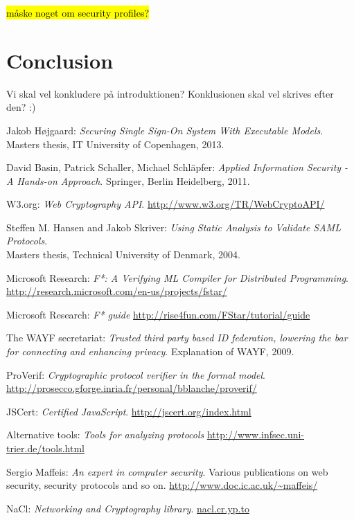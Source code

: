 \documentclass[twosided]{report}
\begin{document}
\hl{m{\aa}ske noget om security profiles?}
\section{Conclusion}
Vi skal vel konkludere på introduktionen? Konklusionen skal vel skrives efter den? :)
\begin{thebibliography}{9}

  Jakob H{\o}jgaard:
  \emph{Securing Single Sign-On System With Executable Models}.
  Masters thesis, IT University of Copenhagen,
  2013.

  David Basin, Patrick Schaller, Michael Schl{\"a}pfer:
  \emph{Applied Information Security - A Hands-on Approach}.
  Springer, Berlin Heidelberg,
  2011.

	W3.org: \emph{Web Cryptography API}. \url{http://www.w3.org/TR/WebCryptoAPI/}

  Steffen M. Hansen and Jakob Skriver:
  \emph{Using Static Analysis to Validate SAML Protocols}.
  \\Masters thesis, Technical University of Denmark,
  2004.

 Microsoft Research:
 \emph{F*: A Verifying ML Compiler for Distributed Programming}.
 \url{http://research.microsoft.com/en-us/projects/fstar/}

 Microsoft Research:
 \emph{F* guide}
 \url{http://rise4fun.com/FStar/tutorial/guide}

 The WAYF secretariat:
 \emph{Trusted third party based ID federation, lowering the bar for
 connecting and enhancing privacy}.
 Explanation of WAYF,
 2009.

 ProVerif:
 \emph{Cryptographic protocol verifier in the formal model}.
 \url{http://prosecco.gforge.inria.fr/personal/bblanche/proverif/}
 
 JSCert:
 \emph{Certified JavaScript}.
 \url{http://jscert.org/index.html}

 Alternative tools:
 \emph{Tools for analyzing protocols}
 \url{http://www.infsec.uni-trier.de/tools.html}

 Sergio Maffeis:
 \emph{An expert in computer security}.
 Various publications on web security, security protocols and so on.
 \url{http://www.doc.ic.ac.uk/~maffeis/}

 NaCl:
 \emph{Networking and Cryptography library}.
 \url{nacl.cr.yp.to}


\end{thebibliography}
\end{document}
